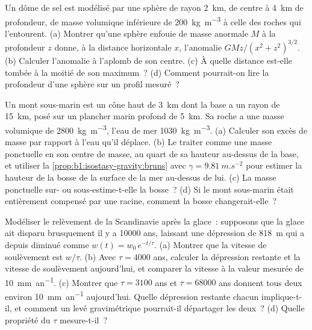 \begin{exercise}[$\star\star\star$]\label{exo:b1:isostasy-gravity:10}
Un dôme de sel est modélisé par une sphère de rayon \qty{2}{km}, de centre à
\qty{4}{km} de profondeur, de masse volumique inférieure de \qty{200}{kg.m^{-3}} à celle des roches
qui l'entourent. (a) Montrer qu'une sphère enfouie de masse anormale $M$ à la profondeur $z$
donne, à la distance horizontale $x$, l'anomalie $GMz/(x^2 + z^2)^{3/2}$.
(b) Calculer l'anomalie à l'aplomb de son centre. (c) À quelle distance est-elle tombée
à la moitié de son maximum~? (d) Comment pourrait-on lire la profondeur d'une sphère sur un profil
mesuré~?
\end{exercise}

\begin{exercise}[$\star\star\star$]\label{exo:b1:isostasy-gravity:11}
Un mont sous-marin est un cône haut de \qty{3}{km} dont la base a un rayon de \qty{15}{km},
posé sur un plancher marin profond de \qty{5}{km}. Sa roche a une masse volumique de
\qty{2800}{kg.m^{-3}}, l'eau de mer \qty{1030}{kg.m^{-3}}. (a) Calculer son excès de
masse par rapport à l'eau qu'il déplace. (b) Le traiter comme une masse ponctuelle en son centre de
masse, au quart de sa hauteur au-dessus de la base, et utiliser
la \cref{prop:b1:isostasy-gravity:bruns} avec $\gamma = \qty{9.81}{m.s^{-2}}$ pour
estimer la hauteur de la bosse de la surface de la mer au-dessus de lui. (c) La masse
ponctuelle sur- ou sous-estime-t-elle la bosse~? (d) Si le mont sous-marin était entièrement
compensé par une racine, comment la bosse changerait-elle~?
\end{exercise}

\begin{exercise}[$\star\star\star$]\label{exo:b1:isostasy-gravity:12}
Modéliser le relèvement de la Scandinavie après la glace~: supposons que la glace ait disparu
brusquement il y a \num{10000} ans, laissant une dépression de \qty{818}{m} qui a
depuis diminué comme $w(t) = w_0\,e^{-t/\tau}$. (a) Montrer que la vitesse de soulèvement est
$w/\tau$. (b) Avec $\tau = \num{4000}$ ans, calculer la dépression restante
et la vitesse de soulèvement aujourd'hui, et comparer la vitesse à la valeur mesurée de
\qty{10}{mm.an^{-1}}. (c) Montrer que $\tau = \num{3100}$ ans et
$\tau = \num{68000}$ ans donnent tous deux environ \qty{10}{mm.an^{-1}} aujourd'hui. Quelle
dépression restante chacun implique-t-il, et comment un levé gravimétrique pourrait-il départager
les deux~? (d) Quelle propriété du  $\tau$ mesure-t-il~?
\end{exercise}

